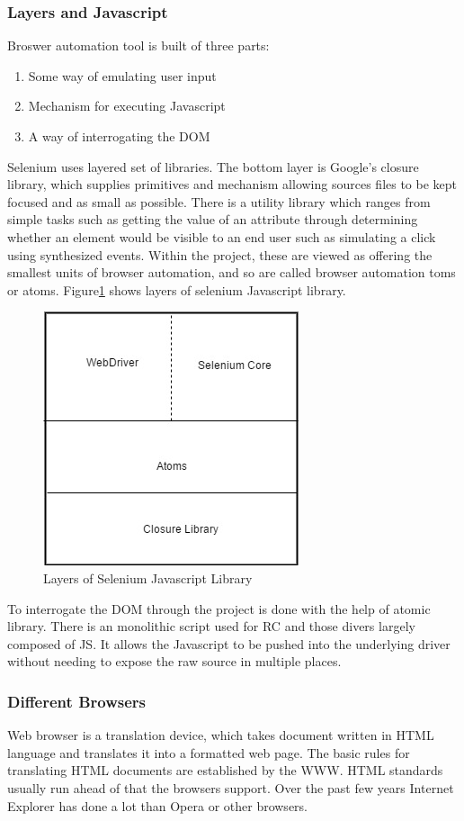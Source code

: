 \documentclass[article,type=msc,colorback,accentcolor=tud9c,twoside,11pt]{tudthesis}
\begin{document}
\subsubsection{Layers and Javascript}
Broswer automation tool is built of three parts:
\begin{enumerate}
	\item Some way of emulating user input
	\item Mechanism for executing Javascript
	\item A way of interrogating the DOM
\end{enumerate}
Selenium uses layered set of libraries. The bottom layer is Google's closure library, which supplies primitives and mechanism allowing sources files to be kept focused and as small as possible. There is a utility library which ranges from simple tasks such as getting the value of an attribute through determining whether an element would be visible to an end user such as simulating a click using synthesized events. Within the project, these are viewed as offering the smallest units of browser automation, and so are called browser automation toms or atoms. Figure\ref{fig:LayersofSeleniumJSLibrary} shows layers of selenium Javascript library.
\begin{figure}[h]
	\centering
	\includegraphics[scale=0.6]{LayersofSeleniumJSLibrary}
	\caption{Layers of Selenium Javascript Library}
	\label{fig:LayersofSeleniumJSLibrary}
\end{figure}
To interrogate the DOM through the project is done with the help of atomic library. There is an monolithic script used for RC and those divers largely composed of JS. It allows the Javascript to be pushed into the underlying driver without needing to expose the raw source in multiple places.

\subsubsection{Different Browsers}
Web browser is a translation device, which takes document written in HTML language and translates it into a formatted web page. The basic rules for translating HTML documents are established by the WWW. HTML standards usually run ahead of that the browsers support. Over the past few years Internet Explorer has done a lot than Opera or other browsers.
\end{document}
